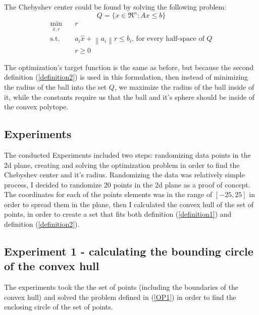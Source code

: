 \documentclass[]{article}
\newcommand{\norm}[1]{\left\lVert#1\right\rVert}
\newcommand{\Q}[0]{\textit{Q}}
\begin{document}
The Chebyshev center could be found by solving the following problem:
\[\Q = \{ x\in \Re^n : Ax\leq b\}\]
\begin{equation}
	\label{LP}
	\begin{aligned}
		\min_{\hat{x},r} \quad &r \\
		\text{s.t.}\quad & a_i \hat{x} + \norm{a_i}r \leq b_i \text{, for every half-space of } \Q \\
		\quad & r\geq 0
	\end{aligned}
\end{equation}

The optimization's target function is the same as before, but because the second definition (\ref{definition2}) is used in this formulation, then instead of minimizing the radius of the ball into the set $\Q$, we maximize the radius of the ball inside of it, while the constants require us that the ball and it's sphere should be inside of the convex polytope.
 
\subsection{Experiments}

The conducted Experiments included two steps: randomizing data points in the 2d plane, creating and solving the optimization problem in order to find the Chebyshev center and it's radius.
Randomizing the data was relatively simple process, I decided to randomize 20 points in the 2d plane as a proof of concept. The coordinates for each of the points elements was in the range of $[-25,25]$ in order to spread them in the plane, then I calculated the convex hull of the set of points, in order to create a set that fits both definition (\ref{definition1}) and definition (\ref{definition2}).

\subsection{Experiment 1 - calculating the bounding circle of the convex hull}

The experiments took the the set of points (including the boundaries of the convex hull) and solved the problem defined in (\ref{OP1}) in order to find the enclosing circle of the set of points.
\end{document}
